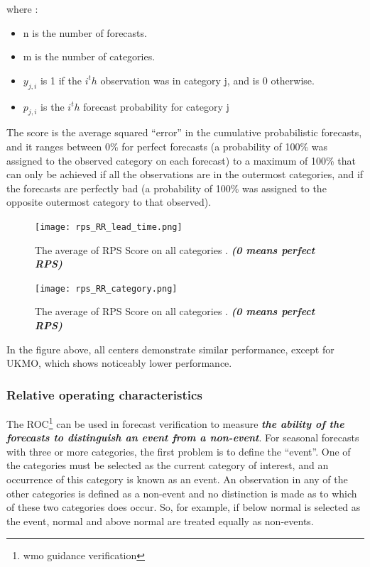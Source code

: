 where : 

\begin{itemize}
	\item n is the number of forecasts.
	\item m is the number of categories.
	\item $y_{j,i}$ is 1 if the $i^th$ observation was in category j, and is 0 otherwise.
	\item $p_{j,i}$ is the $i^th$ forecast probability for category j
\end{itemize}

The score is the average squared “error” in the cumulative
probabilistic forecasts, and it ranges between 0\% for perfect forecasts (a probability of 100\%
was assigned to the observed category on each forecast) to a maximum of 100\% that can only
be achieved if all the observations are in the outermost categories, and if the forecasts are
perfectly bad (a probability of 100\% was assigned to the opposite outermost category to that
observed).


\begin{figure}[H]
    \centering
    \texttt{[image: rps\_RR\_lead\_time.png]}
    \caption{The average of  RPS Score on all categories    . \textbf{\textit{(0 means perfect RPS)}}}
\end{figure}

\begin{figure}[H]
    \centering
    \texttt{[image: rps\_RR\_category.png]}
    \caption{The average of  RPS Score on all categories    . \textbf{\textit{(0 means perfect RPS)}}}
\end{figure}

In the figure above, all centers demonstrate similar performance, except for UKMO, which shows noticeably lower performance.





\subsubsection{Relative operating characteristics}
The ROC\footnote{wmo guidance verification} can be used in forecast verification to measure \textbf{\textit{the ability of the forecasts to distinguish an event from a non-event}}. For seasonal forecasts with three or more categories, the first
problem is to define the “event”. One of the categories must be selected as the current category
of interest, and an occurrence of this category is known as an event. An observation in any of
the other categories is defined as a non-event and no distinction is made as to which of these
two categories does occur. So, for example, if below normal is selected as the event, normal
and above normal are treated equally as non-events.

